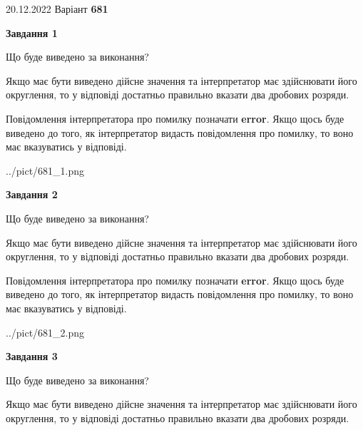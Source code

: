\documentclass[12pt, ukrainian]{article}
\begin{document}
{20.12.2022 Варіант \No \textbf { 681 }\par}
{
\begin {Large}

{\begin {center}\textbf{Завдання 1}\end {center}}\par
Що буде виведено за виконання? \par

Якщо має бути виведено дійсне значення та інтерпретатор має здійснювати його округлення, 
то у відповіді достатньо правильно вказати два дробових розряди.

Повідомлення інтерпретатора про помилку позначати \textbf{error}.
Якщо щось буде виведено до того, як інтерпретатор видасть повідомлення про помилку, 
то воно має вказуватись у відповіді. \par

\begin{center}
	{../pict/681_1.png}
\end{center}
\newpage

{\begin {center}\textbf{Завдання 2}\end {center}}\par
Що буде виведено за виконання? \par

Якщо має бути виведено дійсне значення та інтерпретатор має здійснювати його округлення, 
то у відповіді достатньо правильно вказати два дробових розряди.

Повідомлення інтерпретатора про помилку позначати \textbf{error}.
Якщо щось буде виведено до того, як інтерпретатор видасть повідомлення про помилку, 
то воно має вказуватись у відповіді. \par

\begin{center}
	{../pict/681_2.png}
\end{center}
\newpage

{\begin {center}\textbf{Завдання 3}\end {center}}\par
Що буде виведено за виконання? \par

Якщо має бути виведено дійсне значення та інтерпретатор має здійснювати його округлення, 
то у відповіді достатньо правильно вказати два дробових розряди.


\end{Large}}
\end{document}
